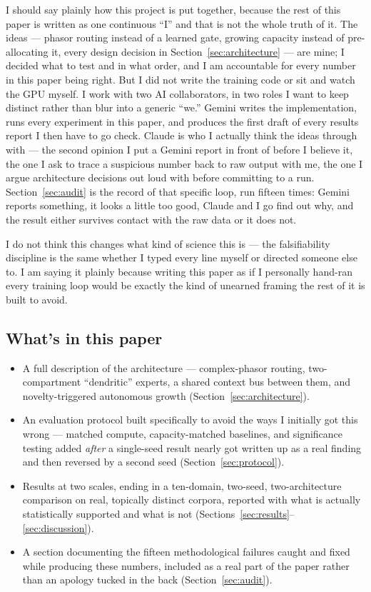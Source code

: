 \documentclass[11pt,letterpaper]{article}
\begin{document}
I should say plainly how this project is put together, because the rest of this paper is written as one continuous ``I'' and that is not the whole truth of it. The ideas --- phasor routing instead of a learned gate, growing capacity instead of pre-allocating it, every design decision in Section~\ref{sec:architecture} --- are mine; I decided what to test and in what order, and I am accountable for every number in this paper being right. But I did not write the training code or sit and watch the GPU myself. I work with two AI collaborators, in two roles I want to keep distinct rather than blur into a generic ``we.'' Gemini writes the implementation, runs every experiment in this paper, and produces the first draft of every results report I then have to go check. Claude is who I actually think the ideas through with --- the second opinion I put a Gemini report in front of before I believe it, the one I ask to trace a suspicious number back to raw output with me, the one I argue architecture decisions out loud with before committing to a run. Section~\ref{sec:audit} is the record of that specific loop, run fifteen times: Gemini reports something, it looks a little too good, Claude and I go find out why, and the result either survives contact with the raw data or it does not.

I do not think this changes what kind of science this is --- the falsifiability discipline is the same whether I typed every line myself or directed someone else to. I am saying it plainly because writing this paper as if I personally hand-ran every training loop would be exactly the kind of unearned framing the rest of it is built to avoid.

\subsection{What's in this paper}
\begin{itemize}[leftmargin=1.4em]
  \item A full description of the architecture --- complex-phasor routing, two-compartment ``dendritic'' experts, a shared context bus between them, and novelty-triggered autonomous growth (Section~\ref{sec:architecture}).
  \item An evaluation protocol built specifically to avoid the ways I initially got this wrong --- matched compute, capacity-matched baselines, and significance testing added \emph{after} a single-seed result nearly got written up as a real finding and then reversed by a second seed (Section~\ref{sec:protocol}).
  \item Results at two scales, ending in a ten-domain, two-seed, two-architecture comparison on real, topically distinct corpora, reported with what is actually statistically supported and what is not (Sections~\ref{sec:results}--\ref{sec:discussion}).
  \item A section documenting the fifteen methodological failures caught and fixed while producing these numbers, included as a real part of the paper rather than an apology tucked in the back (Section~\ref{sec:audit}).
\end{itemize}
\end{document}
